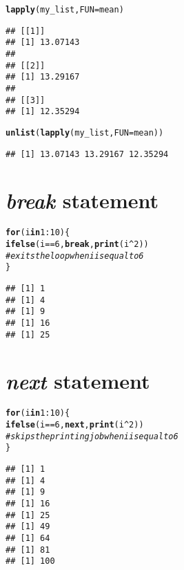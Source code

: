 \documentclass[11pt, a4paper]{article}\usepackage[]{graphicx}\usepackage[]{xcolor}
\makeatletter
\newcommand{\hlnum}[1]{\textcolor[rgb]{0.686,0.059,0.569}{#1}}%
\newcommand{\hlcom}[1]{\textcolor[rgb]{0.678,0.584,0.686}{\textit{#1}}}%
\newcommand{\hlopt}[1]{\textcolor[rgb]{0,0,0}{#1}}%
\newcommand{\hldef}[1]{\textcolor[rgb]{0.345,0.345,0.345}{#1}}%
\newcommand{\hlkwa}[1]{\textcolor[rgb]{0.161,0.373,0.58}{\textbf{#1}}}%
\newcommand{\hlkwc}[1]{\textcolor[rgb]{0.333,0.667,0.333}{#1}}%
\newcommand{\hlkwd}[1]{\textcolor[rgb]{0.737,0.353,0.396}{\textbf{#1}}}%
\newenvironment{kframe}{%
 \def\at@end@of@kframe{}%
 \ifinner\ifhmode%
  \def\at@end@of@kframe{\end{minipage}}%
  \begin{minipage}{\columnwidth}%
 \fi\fi%
 \def\FrameCommand##1{\hskip\@totalleftmargin \hskip-\fboxsep
 \colorbox{shadecolor}{##1}\hskip-\fboxsep
     \hskip-\linewidth \hskip-\@totalleftmargin \hskip\columnwidth}%
 \MakeFramed {\advance\hsize-\width
   \@totalleftmargin\z@ \linewidth\hsize
   \@setminipage}}%
 {\par\unskip\endMakeFramed%
 \at@end@of@kframe}
\newenvironment{knitrout}{}{} %
\makeatother
\begin{document}
\begin{knitrout}
\color{fgcolor}\begin{kframe}
\begin{alltt}
\hlkwd{lapply}\hldef{(my_list,} \hlkwc{FUN} \hldef{= mean)}
\end{alltt}
\begin{verbatim}
## [[1]]
## [1] 13.07143
## 
## [[2]]
## [1] 13.29167
## 
## [[3]]
## [1] 12.35294
\end{verbatim}
\begin{alltt}
\hlkwd{unlist}\hldef{(}\hlkwd{lapply}\hldef{(my_list,} \hlkwc{FUN} \hldef{= mean))}
\end{alltt}
\begin{verbatim}
## [1] 13.07143 13.29167 12.35294
\end{verbatim}
\end{kframe}
\end{knitrout}

\section{\textit{break} statement}

\begin{knitrout}
\color{fgcolor}\begin{kframe}
\begin{alltt}
\hlkwa{for} \hldef{(i} \hlkwa{in} \hlnum{1}\hlopt{:}\hlnum{10}\hldef{) \{}
    \hlkwd{ifelse}\hldef{(i} \hlopt{==} \hlnum{6}\hldef{,} \hlkwa{break}\hldef{,} \hlkwd{print}\hldef{(i}\hlopt{^}\hlnum{2}\hldef{))}
    \hlcom{# exits the loop when i is equal to 6}
\hldef{\}}
\end{alltt}
\begin{verbatim}
## [1] 1
## [1] 4
## [1] 9
## [1] 16
## [1] 25
\end{verbatim}
\end{kframe}
\end{knitrout}

\section{\textit{next} statement}

\begin{knitrout}
\color{fgcolor}\begin{kframe}
\begin{alltt}
\hlkwa{for} \hldef{(i} \hlkwa{in} \hlnum{1}\hlopt{:}\hlnum{10}\hldef{) \{}
    \hlkwd{ifelse}\hldef{(i} \hlopt{==} \hlnum{6}\hldef{,} \hlkwa{next}\hldef{,} \hlkwd{print}\hldef{(i}\hlopt{^}\hlnum{2}\hldef{))}
    \hlcom{# skips the printing job when i is equal to 6}
\hldef{\}}
\end{alltt}
\begin{verbatim}
## [1] 1
## [1] 4
## [1] 9
## [1] 16
## [1] 25
## [1] 49
## [1] 64
## [1] 81
## [1] 100
\end{verbatim}
\end{kframe}
\end{knitrout}
\end{document}
